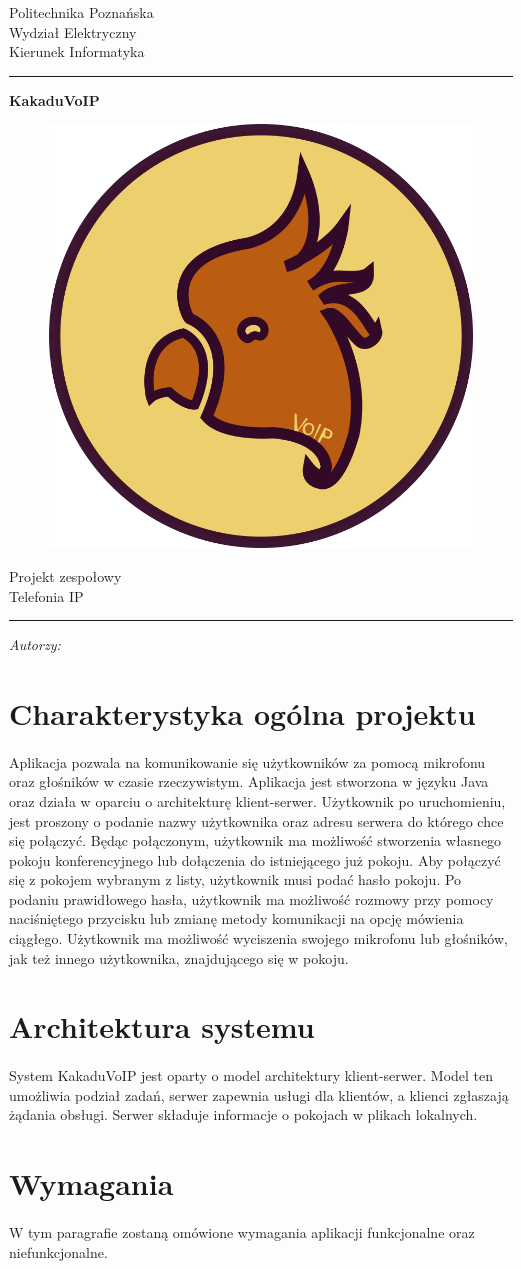\documentclass[12pt,a4paper,notitlepage]{report}
\author{\Large{Szymon Zieliński \\[0.2cm] szymon.r.zielinski@gmail.com \\[0.2cm] 126812\\[0.4cm] Oskar Rutkowski \\[0.2cm] oskar.rutkowski@student.put.poznan.pl \\[0.2cm] 126845} }
\makeatletter
\newcommand{\linia}{\rule{\linewidth}{0.5mm}}
\renewcommand{\maketitle}{\begin{titlepage}
		
		\vspace*{1cm}
		
		\begin{center}\small
			
			Politechnika Poznańska\\
			
			Wydział Elektryczny\\
			
			Kierunek Informatyka
			
		\end{center}
		
		\vspace{2cm}
		
		\linia
		
		\begin{center}
			
			\LARGE {\textbf{KakaduVoIP} \\[1cm]}
			\begin{figure}[h]
				\centering
				\includegraphics[scale=0.2]{Kakadu}
			\end{figure}
		  \LARGE {Projekt zespołowy  \\ Telefonia IP}
			
		\end{center}
		
		\linia
		
		\vspace{3cm}
		
		\begin{flushright}
			
			\begin{minipage}{15cm}
				
				\textit{ \Large{Autorzy:}}\\
				
				\normalsize{\@author} \par
				
			\end{minipage}
			
		\end{flushright}
		
		\vspace*{\stretch{6}}
		
		\begin{center}
			
			\@date
			
		\end{center}
		
	\end{titlepage}%
	
}
\makeatother
\begin{document}
	
	\maketitle
	\newpage
	\tableofcontents
	\newpage
	
	\section{Charakterystyka ogólna projektu}
	\paragraph*{} Aplikacja pozwala na komunikowanie się użytkowników za pomocą mikrofonu oraz głośników w czasie rzeczywistym. Aplikacja jest stworzona w języku Java oraz działa w oparciu o architekturę klient-serwer. Użytkownik po uruchomieniu, jest proszony o podanie nazwy użytkownika oraz adresu serwera  do którego chce się połączyć. Będąc połączonym, użytkownik ma możliwość stworzenia własnego pokoju konferencyjnego lub dołączenia do istniejącego już pokoju. Aby połączyć się z pokojem wybranym z listy, użytkownik musi podać hasło pokoju. Po podaniu prawidłowego hasła, użytkownik ma możliwość rozmowy przy pomocy naciśniętego przycisku lub zmianę metody komunikacji na opcję mówienia ciągłego. Użytkownik ma możliwość wyciszenia swojego mikrofonu lub głośników, jak też innego użytkownika, znajdującego się w pokoju.
	\section{Architektura systemu}
	\paragraph*{} System KakaduVoIP jest oparty o model architektury klient-serwer. Model ten umożliwia podział zadań, serwer zapewnia usługi dla klientów, a klienci zgłaszają żądania obsługi. Serwer składuje informacje o pokojach w plikach lokalnych.
	\section{Wymagania}
	\paragraph*{} W tym paragrafie zostaną omówione wymagania aplikacji funkcjonalne oraz niefunkcjonalne.
\end{document}
